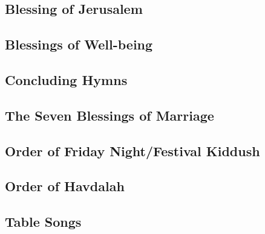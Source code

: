 ﻿\documentclass[a5paper, 12pt]{Birchon}
\begin{document}
\begin{english}
\subsection*{Blessing of Jerusalem}
\end{english}

\begin{english}
\subsection*{Blessings of Well-being}
\end{english}

\begin{english}
\subsection*{Concluding Hymns}
\end{english}

\begin{english}
\subsection*{The Seven Blessings of Marriage}
\end{english}

\begin{english}
\section*{Order of Friday Night/Festival Kiddush}
\end{english}

\begin{english}
\section*{Order of Havdalah}
\end{english}

\begin{english}
\section*{Table Songs}
\end{english}
\end{document}
